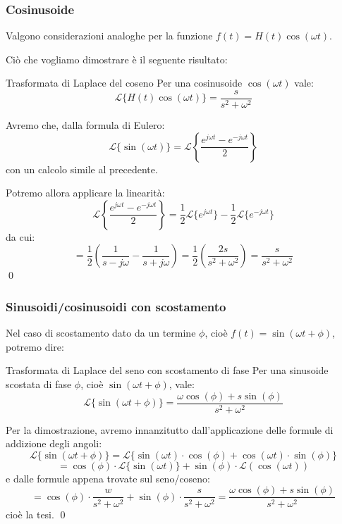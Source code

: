 \documentclass[a4paper,11pt]{article}
\begin{document}
\subsubsection{Cosinusoide}
Valgono considerazioni analoghe per la funzione $f(t) = H(t) \cos(\omega t)$.

Ciò che vogliamo dimostrare è il seguente risultato:
\begin{theorem}{Trasformata di Laplace del coseno}
	Per una cosinusoide $\cos(\omega t)$ vale:
	$$
		\mathcal{L}\{ H(t) \cos(\omega t) \} = \frac{s}{s^2 + \omega^2}
	$$
\end{theorem}

Avremo che, dalla formula di Eulero:
$$
\mathcal{L}\{\sin(\omega t)\} = \mathcal{L}\left\{ \frac{e^{j \omega t} - e^{- j \omega t}}{2} \right\}
$$
con un calcolo simile al precedente.

Potremo allora applicare la linearità:
$$
\mathcal{L}\left\{ \frac{e^{j \omega t} - e^{- j \omega t}}{2} \right\} = \frac{1}{2} \mathcal{L}\{e^{j \omega t}\} - \frac{1}{2} \mathcal{L}\{e^{-j \omega t}\}
$$
da cui:
$$
= \frac{1}{2}\left( \frac{1}{s - j\omega} - \frac{1}{s + j \omega} \right) = \frac{1}{2}\left( \frac{2s}{s^2 + \omega^2} \right) = \frac{s}{s^2 + \omega^2}
$$ \qed

\subsubsection{Sinusoidi/cosinusoidi con scostamento}
Nel caso di scostamento dato da un termine $\phi$, cioè $f(t) = \sin(\omega t + \phi)$, potremo dire:
\begin{theorem}{Trasformata di Laplace del seno con scostamento di fase}
	Per una sinusoide scostata di fase $\phi$, cioè $\sin(\omega t + \phi)$, vale:
	$$
	\mathcal{L}\{ \sin(\omega t + \phi) \} = \frac{\omega \cos(\phi) + s \sin(\phi)}{s^2 + \omega^2}
	$$
\end{theorem}

Per la dimostrazione, avremo innanzitutto dall'applicazione delle formule di addizione degli angoli:
$$
\mathcal{L}\{\sin(\omega t + \phi)\} = \mathcal{L}\{ \sin(\omega t) \cdot \cos(\phi) + \cos(\omega t) \cdot \sin(\phi) \} 
$$
$$
= \cos(\phi) \cdot \mathcal{L} \{ \sin(\omega t) \} + \sin(\phi) \cdot \mathcal{L}(\cos (\omega t))
$$
e dalle formule appena trovate sul seno/coseno:
$$
= \cos(\phi) \cdot \frac{w}{s^2 + \omega ^2} + \sin(\phi) \cdot \frac{s}{s^2 + \omega ^2} = \frac{\omega \cos(\phi) + s \sin(\phi)}{s^2 + \omega^2}
$$
cioè la tesi. \qed
\end{document}
